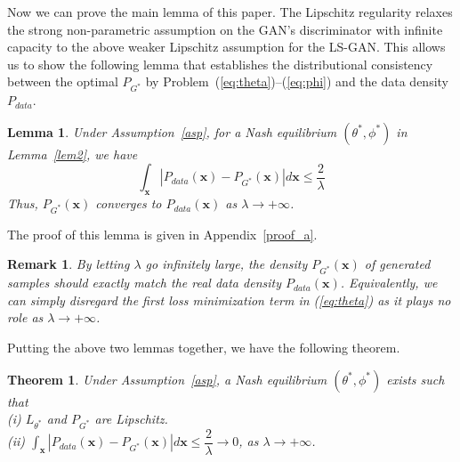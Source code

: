 \documentclass[11pt,fullpage, letterpaper,twoside]{article}
\newtheorem{theorem}{Theorem}
\newtheorem{lemma}{Lemma}
\newtheorem{remark}{Remark}
\newcommand{\1}[1]{\mathds{1}_{\left[#1\right]}}
\begin{document}
Now we can prove the main lemma of this paper. The Lipschitz regularity relaxes the strong non-parametric assumption on the GAN's discriminator with infinite capacity to the above weaker Lipschitz assumption for the LS-GAN. This allows us to show the following lemma that establishes the distributional consistency between the optimal $P_{G^*}$ by Problem~(\ref{eq:theta})--(\ref{eq:phi}) and the data density $P_{data}$.











\begin{lemma}\label{lem1}
{Under Assumption~\ref{asp}, for a Nash equilibrium $(\theta^*,\phi^*)$ in Lemma~\ref{lem2}, we have
$$
\int_{\mathbf x}|P_{data}(\mathbf x)-P_{G^*}(\mathbf x)|d\mathbf x \leq \dfrac{2}{\lambda}
$$
Thus, $P_{G^*}(\mathbf x)$ converges to $P_{data}(\mathbf x)$ as $\lambda\rightarrow+\infty$.}
\end{lemma}
The proof of this lemma is given in Appendix~\ref{proof_a}.
\begin{remark}
By letting $\lambda$ go infinitely large, the density $P_{G^*}(\mathbf x)$ of generated samples should exactly match the real data density $P_{data}(\mathbf x)$.  Equivalently, we can simply disregard the first loss minimization term in (\ref{eq:theta}) as it plays no role as $\lambda\rightarrow+\infty$.
\end{remark}






Putting the above two lemmas together, we have the following theorem.
\begin{theorem}\label{thm3}
Under Assumption~\ref{asp}, a Nash equilibrium $(\theta^*,\phi^*)$ exists such that\\
(i) $L_{\theta^*}$ and $P_{G^*}$ are Lipschitz.\\
(ii) $\int_{\mathbf x}|P_{data}(\mathbf x)-P_{G^*}(\mathbf x)|d\mathbf x \leq \dfrac{2}{\lambda}\rightarrow 0$, as $\lambda \rightarrow +\infty$.\\
\end{theorem}
\end{document}
